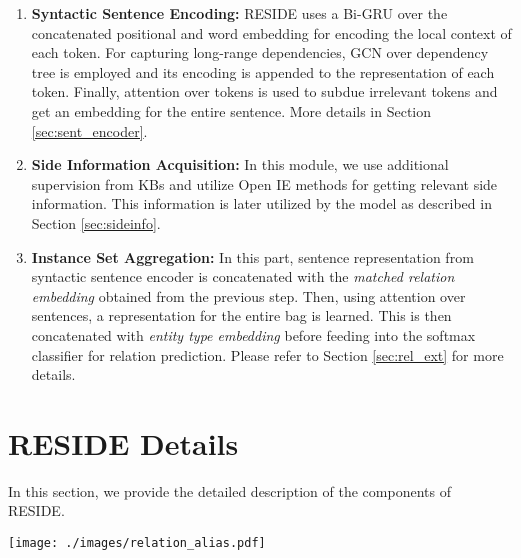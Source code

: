 \documentclass[11pt,a4paper]{article}
\newcommand{\refsec}[1]{Section \ref{#1}}
\newcommand{\method}{RESIDE}
\newcommand{\lstm}{GRU}
\newcommand{\stepOne}{Syntactic Sentence Encoding}
\newcommand{\stepTwo}{Side Information Acquisition}
\newcommand{\stepThree}{Instance Set Aggregation}
\begin{document}
\begin{enumerate}[itemsep=2pt,parsep=0pt,partopsep=0pt,leftmargin=*]
	\item \textbf{\stepOne{}:} \method{} uses a Bi-\lstm{} over the concatenated positional and word embedding for encoding the local context of each token. For capturing long-range dependencies, GCN over dependency tree is employed and its encoding is appended to the representation of each token. Finally, attention over tokens is used to subdue irrelevant tokens and get an embedding for the entire sentence. More details in \refsec{sec:sent_encoder}.
	
	\item \textbf{\stepTwo{}:} In this module, we use additional supervision from KBs and utilize Open IE methods for getting relevant side information. This information is later utilized by the model as described in \refsec{sec:sideinfo}.
	
	\item \textbf{\stepThree{}:} In this part, sentence representation from syntactic sentence encoder is concatenated with the \textit{matched relation embedding} obtained from the previous step. Then, using attention over sentences, a representation for the entire bag is learned. This is then concatenated with \textit{entity type embedding} before feeding into the softmax classifier for relation prediction. Please refer to \refsec{sec:rel_ext} for more details.
	
\end{enumerate} \section{\method{} Details}
\label{sec:details}

In this section, we provide the detailed description of the components of \method{}.

\begin{figure*}[t]
	\centering
	\texttt{[image: ./images/relation\_alias.pdf]}
	\caption{\label{fig:rel_alias}Relation alias side information extraction for a given sentence. First, Syntactic Context Extractor identifies relevant relation phrases  between target entities. They are then matched in the embedding space with the extended set of relation aliases  from KB. Finally, the relation embedding corresponding to the closest alias is taken as relation alias information. Please refer \refsec{sec:sideinfo}. } 
\end{figure*}
\end{document}
